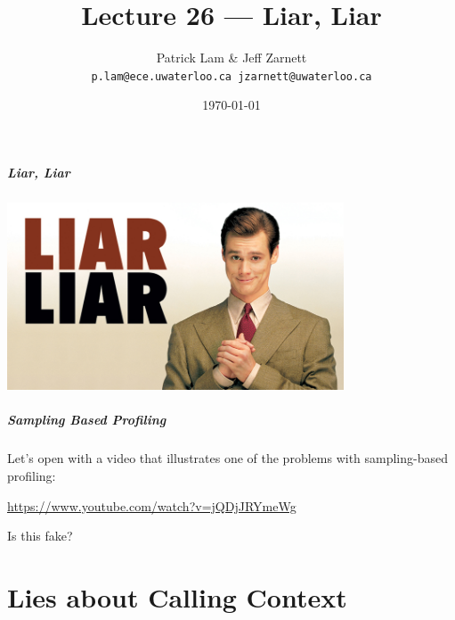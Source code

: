 

\title{Lecture 26 --- Liar, Liar }

\author{Patrick Lam \& Jeff Zarnett \\ \small \texttt{p.lam@ece.uwaterloo.ca jzarnett@uwaterloo.ca}}
\date{\today}




\begin{frame}
  \titlepage

 \end{frame}



\begin{frame}
\frametitle{Liar, Liar}

\begin{center}
	\includegraphics[width=0.75\textwidth]{images/Liar-Liar.jpg}
\end{center}


\end{frame}

\begin{frame}
\frametitle{Sampling Based Profiling}

Let's open with a video that illustrates one of the problems with sampling-based profiling:

\begin{center}
	\url{https://www.youtube.com/watch?v=jQDjJRYmeWg}
\end{center}

Is this fake?

\end{frame}

\part{Lies about Calling Context}

\begin{frame}
  \partpage
\end{frame}

